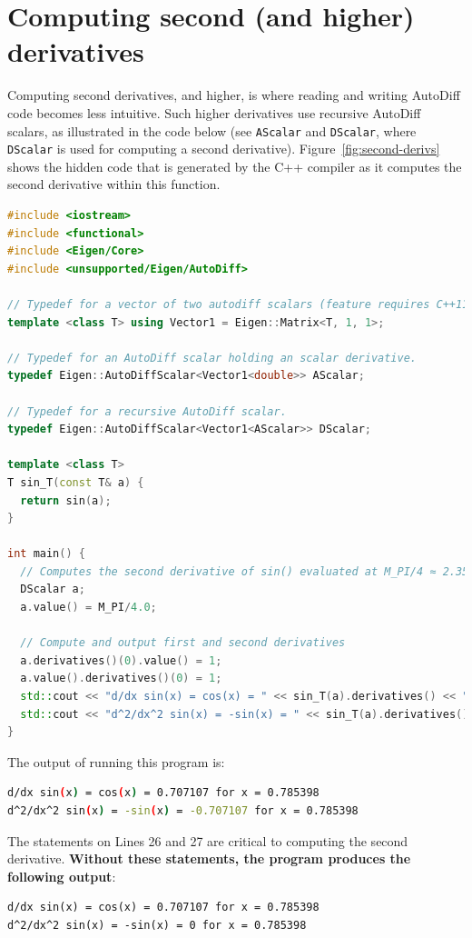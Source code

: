 \documentclass[letterpaper, 12 pt, onecolumn, journal]{IEEEtran}  %
\begin{document}
\section{Computing second (and higher) derivatives}
\label{section:second-derivs}
Computing second derivatives, and higher, is where reading and writing AutoDiff code becomes less intuitive. Such higher derivatives use recursive AutoDiff scalars, as illustrated in the code below (see \texttt{AScalar} and \texttt{DScalar}, where \texttt{DScalar} is used for computing a second derivative). Figure~\ref{fig:second-derivs} shows the hidden code that is generated by the C++ compiler as it computes the second derivative within this function.

\begin{lstlisting}[language=C++]
#include <iostream>
#include <functional>
#include <Eigen/Core>
#include <unsupported/Eigen/AutoDiff>

// Typedef for a vector of two autodiff scalars (feature requires C++11). 
template <class T> using Vector1 = Eigen::Matrix<T, 1, 1>;

// Typedef for an AutoDiff scalar holding an scalar derivative.
typedef Eigen::AutoDiffScalar<Vector1<double>> AScalar;

// Typedef for a recursive AutoDiff scalar.
typedef Eigen::AutoDiffScalar<Vector1<AScalar>> DScalar;

template <class T>
T sin_T(const T& a) {
  return sin(a);
}

int main() {
  // Computes the second derivative of sin() evaluated at M_PI/4 ≈ 2.35619...
  DScalar a;
  a.value() = M_PI/4.0;

  // Compute and output first and second derivatives
  a.derivatives()(0).value() = 1;
  a.value().derivatives()(0) = 1;
  std::cout << "d/dx sin(x) = cos(x) = " << sin_T(a).derivatives() << " for x = " << a.value() << std::endl;
  std::cout << "d^2/dx^2 sin(x) = -sin(x) = " << sin_T(a).derivatives()(0).derivatives() << " for x = " << a.value() << std::endl;
}
\end{lstlisting}
The output of running this program is:
\begin{lstlisting}[language=bash]
d/dx sin(x) = cos(x) = 0.707107 for x = 0.785398
d^2/dx^2 sin(x) = -sin(x) = -0.707107 for x = 0.785398
\end{lstlisting}

The statements on Lines 26 and 27 are critical to computing the second derivative. \textbf{Without these statements, the program produces the following output}:
\begin{lstlisting}
d/dx sin(x) = cos(x) = 0.707107 for x = 0.785398
d^2/dx^2 sin(x) = -sin(x) = 0 for x = 0.785398
\end{lstlisting}
\end{document}
